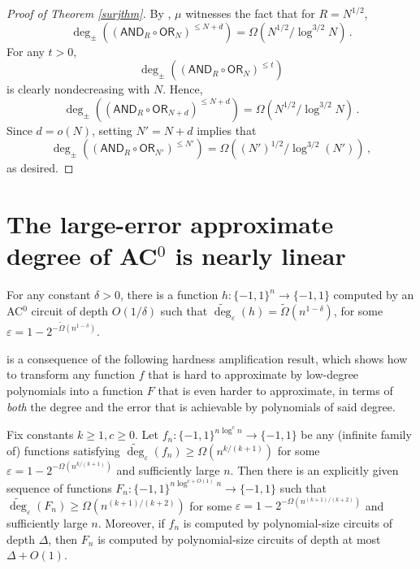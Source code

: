 \documentclass{toc}
\newcommand{\OR}{\mathsf{ OR}}
\newcommand{\bits}{\{-1,1\}}
\newcommand{\eps}{\varepsilon}
\newcommand{\adeg}{\widetilde{\operatorname{deg}}}
\newcommand{\AND}{\mathsf{AND}}
\begin{document}
\begin{proof}[Proof of Theorem \ref{surjthm}]
	By , $\mu$ witnesses the fact that for $R=N^{1/2}$,
%
%
\[\deg_{\pm}\left(\left(\AND_R \circ \OR_N\right)^{\leq N+d}\right) =
\Omega\left(N^{1/2}/\log^{3/2} N\right)\,.\]
For any $t > 0$,
%
\[ \deg_{\pm}\left(\left(\AND_R \circ \OR_N\right)^{\leq t}\right) \]
is clearly nondecreasing with $N$. Hence, 
%
%
\[ \deg_{\pm}\left(\left(\AND_R \circ \OR_{N+d}\right)^{\leq N+d}\right) = \Omega\left(N^{1/2}/\log^{3/2} N\right) \,.\]
Since $d=o(N)$, setting $N'=N+d$ implies that
%
%
\[ \deg_{\pm}\left(\left(\AND_R \circ \OR_{N'}\right)^{\leq N'}\right)
 = \Omega\left((N')^{1/2}/\log^{3/2}(N')\right)\,,\]
as desired.  %
\end{proof}

\section{The large-error approximate degree of
  \texorpdfstring{AC$^0$}{AC0} is nearly linear}
\label{s:discproof}
\begin{theorem} \label{ac0thm}
	For any constant $\delta > 0$, there is a function $h \colon \bits^n \to \bits$ computed
	by an AC$^0$ circuit of depth $O(1/\delta)$ such that $\adeg_{\eps}(h) = \tilde{\Omega}(n^{1-\delta})$,
	for some $\eps=1-2^{-\tilde{\Omega}(n^{1-\delta})}$. 
\end{theorem}

 is a consequence of the following hardness amplification result, which
shows how to transform any function $f$ that is hard to approximate by low-degree polynomials
into a function $F$ that is even harder to approximate, in terms of \emph{both} the degree
and the error that is achievable by polynomials of said degree.

\begin{theorem} \label{hardnessamp}
	Fix constants $k\geq 1, c \ge 0$. Let $f_n \colon \bits^{n\log^c n} \to \bits$ be any (infinite family of) functions satisfying $\adeg_{\eps}(f_n) \geq \Omega\left(n^{k/(k+1)}\right)$
	for some $\eps=1-2^{-\Omega(n^{k/(k+1)})}$ and sufficiently large $n$. Then there is an explicitly given sequence of functions
	$F_n \colon \bits^{n \log^{c+O(1)}n} \to \bits$ such that 
	$\adeg_{\eps}(F_n) \geq \Omega\left(n^{(k+1)/(k+2)}\right)$
	for some $\eps=1-2^{-\Omega\left(n^{(k+1)/(k+2)}\right)}$ and sufficiently large $n$. Moreover,
	if $f_n$ is computed by polynomial-size %
circuits of depth %
$\Delta$, then $F_n$ is computed by 
polynomial-size %
circuits of depth at most $\Delta+O(1)$. 
\end{theorem}
\end{document}
